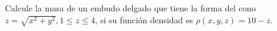 \item Calcule la masa de un embudo delgado que tiene la forma del cono $z = \sqrt{x^2 + y^2}, 1 \le z \le 4$, si su función densidad es $\rho(x,y,z) = 10 - z$.
